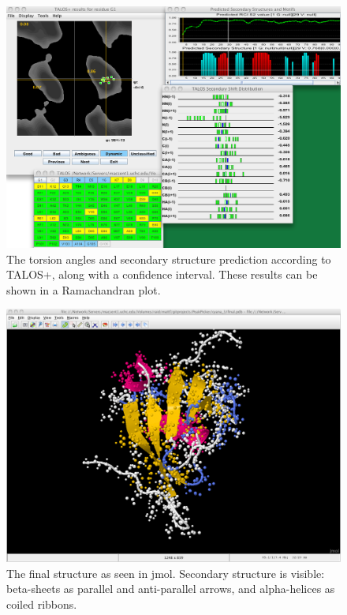 \begin{figure}
  \includegraphics[scale=0.25]{figures/talos+_results}
  \caption[The secondary structure prediction according to TALOS+.]
          {The torsion angles and secondary structure prediction 
           according to TALOS+, along with a confidence interval.  
           These results can be shown in a Ramachandran plot.}
  \label{talos+_results}
\end{figure}

\begin{figure}
  \includegraphics[scale=0.25]{figures/structure}
  \caption[The final structure as seen in jmol.]
          {The final structure as seen in jmol.
           Secondary structure is visible: beta-sheets as parallel and
           anti-parallel arrows, and alpha-helices as coiled ribbons.}
  \label{structure}
\end{figure}

